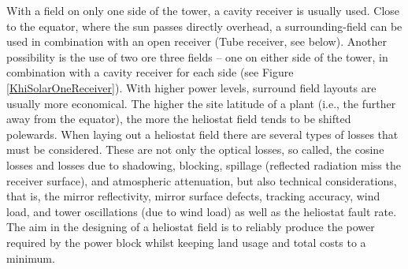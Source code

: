 \documentclass[Master,MEE,english]{twbook}%
\begin{document}
With a field on only one side of the tower, a cavity receiver is usually used. Close to the equator, where the sun passes directly overhead, a surrounding-field can be used in combination with an open receiver (Tube receiver, see below). Another possibility is the use of two ore three fields – one on either side of the tower, in combination with a cavity receiver for each side (see Figure \ref{KhiSolarOneReceiver}). With higher power levels, surround field layouts are usually more economical. The higher the site latitude of a plant (i.e., the further away from the equator), the more the heliostat field tends to be shifted polewards. When laying out a heliostat field there are several types of losses that must be considered. These are not only the optical losses, so called, the cosine losses and losses due to shadowing, blocking, spillage (reflected radiation miss the receiver surface), and atmospheric attenuation, but also technical considerations, that is, the mirror reflectivity, mirror surface defects, tracking accuracy, wind load, and tower oscillations (due to wind load) as well as the heliostat fault rate. The aim in the designing of a heliostat field is to reliably produce the power required by the power block whilst keeping land usage and total costs to a minimum. \cite{Vant-Hull2012} \pagebreak
\end{document}

